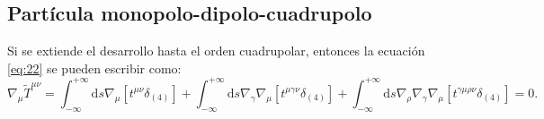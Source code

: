 \subsection{Partícula monopolo-dipolo-cuadrupolo}

Si se extiende el desarrollo hasta el orden cuadrupolar, entonces la ecuación \eqref{eq:22} se pueden escribir como:
\begin{equation}
\label{eq:48}
\nabla_{\mu} \tilde{T}^{\mu \nu} = \int_{-\infty}^{+\infty} \mathrm{d}s \nabla_{\mu} [ t^{\mu \nu} \delta_{(4)}] + \int_{-\infty}^{+\infty} \mathrm{d}s \nabla_{\gamma}\nabla_{\mu} [ t^{\mu \gamma \nu} \delta_{(4)}] + \int_{-\infty}^{+\infty} \mathrm{d}s \nabla_{\rho} \nabla_{\gamma} \nabla_{\mu} [ t^{\gamma \mu \rho \nu} \delta_{(4)}] = 0.
\end{equation}

